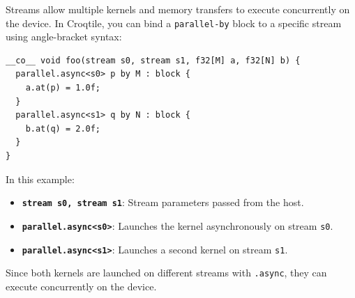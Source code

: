 Streams allow multiple kernels and memory transfers to execute concurrently on the device. In Croqtile, you can bind a \texttt{parallel-by} block to a specific stream using angle-bracket syntax:

\begin{lstlisting}[language=croqtile,caption={Stream Binding}]
__co__ void foo(stream s0, stream s1, f32[M] a, f32[N] b) {
  parallel.async<s0> p by M : block {
    a.at(p) = 1.0f;
  }
  parallel.async<s1> q by N : block {
    b.at(q) = 2.0f;
  }
}
\end{lstlisting}

In this example:

\begin{itemize}[leftmargin=1.6em]
\item \textbf{\texttt{stream s0, stream s1}}: Stream parameters passed from the host.
\item \textbf{\texttt{parallel.\allowbreak{}async\textless{}s0\textgreater{}}}: Launches the kernel asynchronously on stream \texttt{s0}.
\item \textbf{\texttt{parallel.\allowbreak{}async\textless{}s1\textgreater{}}}: Launches a second kernel on stream \texttt{s1}.
\end{itemize}

Since both kernels are launched on different streams with \texttt{.async}, they can execute concurrently on the device.
